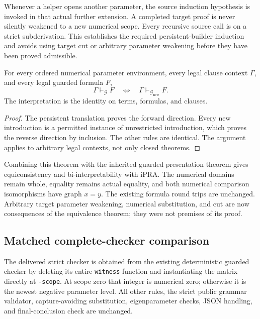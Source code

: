 Whenever a helper opens another parameter, the source induction
hypothesis is invoked in that actual further extension.  A completed
target proof is never silently weakened to a new numerical scope.
Every recursive source call is on a strict subderivation.  This
establishes the required persistent-builder induction and avoids using
target cut or arbitrary parameter weakening before they have been
proved admissible.

\begin{theorem}
For every ordered numerical parameter environment, every legal clause
context $\Gamma$, and every legal guarded formula $F$,
\[
       \Gamma\vdash_{\mathcal G}F
       \quad\Longleftrightarrow\quad
       \Gamma\vdash_{\mathcal G_{\mathrm{new}}}F.
\]
The interpretation is the identity on terms, formulas, and clauses.
\end{theorem}

\begin{proof}
The persistent translation proves the forward direction.  Every new
introduction is a permitted instance of unrestricted introduction,
which proves the reverse direction by inclusion.  The other rules
are identical.  The argument applies to arbitrary legal contexts,
not only closed theorems.
\end{proof}

Combining this theorem with the inherited guarded presentation theorem
gives equiconsistency and bi-interpretability with iPRA.  The numerical
domains remain whole, equality remains actual equality, and both
numerical comparison isomorphisms have graph $x=y$.  The existing
formula round trips are unchanged.  Arbitrary target parameter
weakening, numerical substitution, and cut are now consequences of
the equivalence theorem; they were not premises of its proof.

\subsection{Matched complete-checker comparison}

The delivered strict checker is obtained from the existing
deterministic guarded checker by deleting its entire \texttt{witness}
function and instantiating the matrix directly at \texttt{-scope}.
At scope zero that integer is numerical zero; otherwise it is the
newest negative parameter level.  All other rules, the strict public
grammar validator, capture-avoiding substitution, eigenparameter
checks, JSON handling, and final-conclusion check are unchanged.

